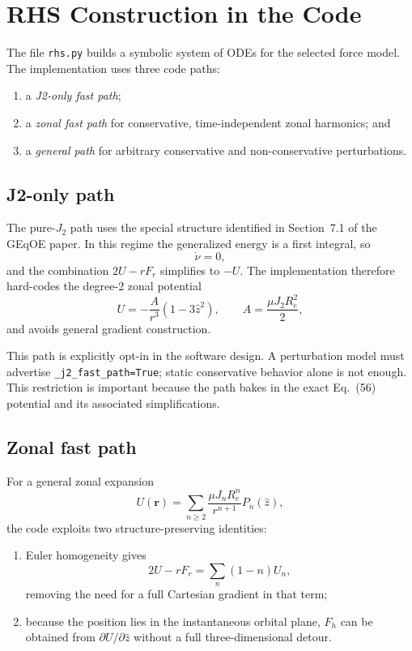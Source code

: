 \documentclass[11pt]{article}
\begin{document}
\section{RHS Construction in the Code}

The file \texttt{rhs.py} builds a symbolic system of ODEs for the selected
force model. The implementation uses three code paths:
\begin{enumerate}
    \item a \emph{J2-only fast path};
    \item a \emph{zonal fast path} for conservative, time-independent zonal
    harmonics; and
    \item a \emph{general path} for arbitrary conservative and
    non-conservative perturbations.
\end{enumerate}

\subsection{J2-only path}

The pure-$J_2$ path uses the special structure identified in Section~7.1 of the
GEqOE paper. In this regime the generalized energy is a first integral, so
\begin{equation}
\dot{\nu} = 0,
\end{equation}
and the combination $2U-rF_r$ simplifies to $-U$. The implementation therefore
hard-codes the degree-2 zonal potential
\begin{equation}
U = -\frac{A}{r^3}(1-3\hat{z}^2), \qquad
A = \frac{\mu J_2 R_e^2}{2},
\end{equation}
and avoids general gradient construction.

This path is explicitly opt-in in the software design. A perturbation model must
advertise \texttt{\_j2\_fast\_path=True}; static conservative behavior alone is
not enough. This restriction is important because the path bakes in the exact
Eq.~(56) potential and its associated simplifications.

\subsection{Zonal fast path}

For a general zonal expansion
\begin{equation}
U(\bm{r}) = \sum_{n \ge 2} \frac{\mu J_n R_e^n}{r^{n+1}} P_n(\hat{z}),
\end{equation}
the code exploits two structure-preserving identities:
\begin{enumerate}
    \item Euler homogeneity gives
    \begin{equation}
    2U-rF_r = \sum_n (1-n) U_n,
    \end{equation}
    removing the need for a full Cartesian gradient in that term;
    \item because the position lies in the instantaneous orbital plane,
    $F_h$ can be obtained from $\partial U / \partial \hat{z}$ without a full
    three-dimensional detour.
\end{enumerate}
\end{document}
